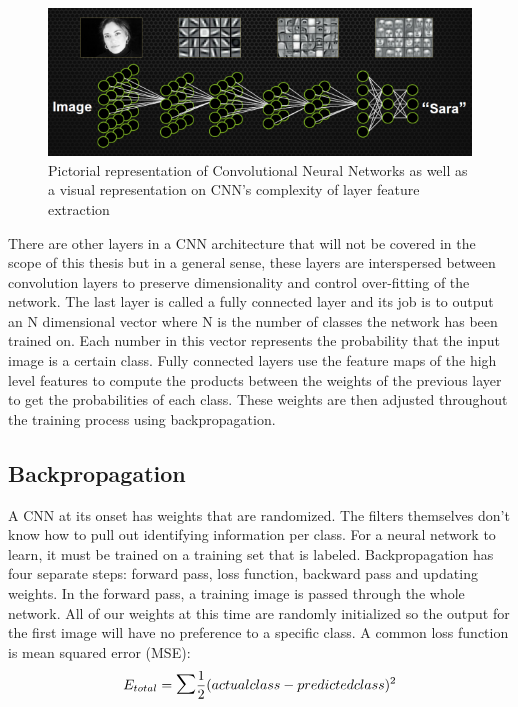 \begin{figure}[h!]
\centering
\includegraphics[width=.9\linewidth]{figs/facialDetection.png}
\caption{Pictorial representation of Convolutional Neural Networks as well as a visual representation on CNN's complexity of layer feature extraction}
\label{fig:featuremaps}
\end{figure}
There are other layers in a CNN architecture that will not be covered in the scope of this thesis but in a general sense, these layers are interspersed between convolution layers to preserve dimensionality and control over-fitting of the network. The last layer is called a fully connected layer and its job is to output an N dimensional vector where N is the number of classes the network has been trained on. Each number in this vector represents the probability that the input image is a certain class. Fully connected layers use the feature maps of the high level features to compute the products between the weights of the previous layer to get the probabilities of each class. These weights are then adjusted throughout the training process using backpropagation. 

\subsection{Backpropagation}
A CNN at its onset has weights that are randomized. The filters themselves don't know how to pull out identifying information per class. For a neural network to learn, it must be trained on a training set that is labeled. Backpropagation has four separate steps: forward pass, loss function, backward pass and updating weights. In the forward pass, a training image is passed through the whole network. All of our weights at this time are randomly initialized so the output for the first image will have no preference to a specific class. A common loss function is mean squared error (MSE): 
\begin{equation}
E_{total} = \mathlarger{\mathlarger{\sum}}\frac{1}{2}(actual class -predicted class)^2 
\end{equation}

